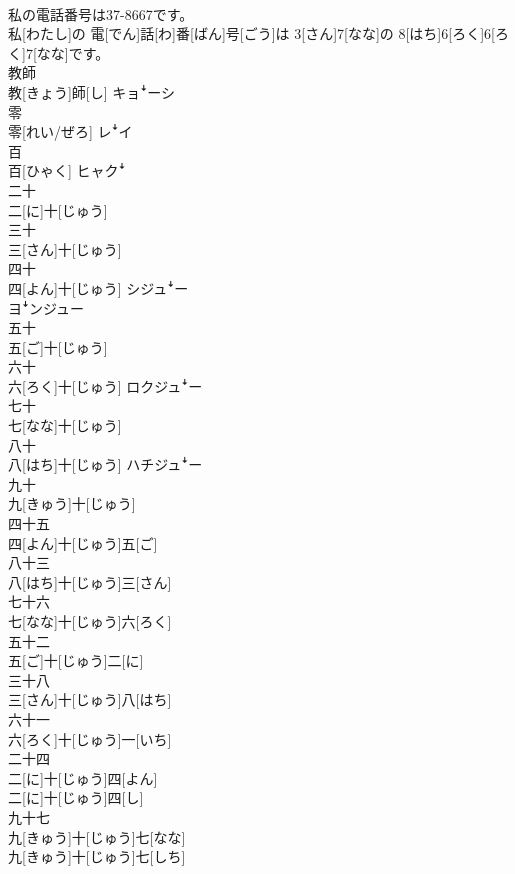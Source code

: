 \documentclass[8pt]{extreport}
\begin{document}
\begin{CJK}{UTF8}{min}
\\	私の電話番号は37-8667です。	
\\	私[わたし]の 電[でん]話[わ]番[ばん]号[ごう]は 3[さん]7[なな]の 8[はち]6[ろく]6[ろく]7[なな]です。
\\	教師	
\\	教[きょう]師[し]	キョꜜーシ
\\	零	
\\	零[れい/ぜろ]	レꜜイ
\\	百	
\\	百[ひゃく]	ヒャクꜜ
\\	二十	
\\	二[に]十[じゅう]
\\	三十	
\\	三[さん]十[じゅう]
\\	四十	
\\	四[よん]十[じゅう]	シジュꜜー 
\\	ヨꜜンジュー
\\	五十	
\\	五[ご]十[じゅう]
\\	六十	
\\	六[ろく]十[じゅう]	ロクジュꜜー
\\	七十	
\\	七[なな]十[じゅう]
\\	八十	
\\	八[はち]十[じゅう]	ハチジュꜜー
\\	九十	
\\	九[きゅう]十[じゅう]
\\	四十五	
\\	四[よん]十[じゅう]五[ご]	
\\	八十三	
\\	八[はち]十[じゅう]三[さん]	
\\	七十六	
\\	七[なな]十[じゅう]六[ろく]
\\	五十二	
\\	五[ご]十[じゅう]二[に]
\\	三十八	
\\	三[さん]十[じゅう]八[はち]
\\	六十一	
\\	六[ろく]十[じゅう]一[いち]	
\\	二十四	
\\	二[に]十[じゅう]四[よん] 
\\	二[に]十[じゅう]四[し]
\\	九十七	
\\	九[きゅう]十[じゅう]七[なな] 
\\	九[きゅう]十[じゅう]七[しち]

\end{CJK}
\end{document}
